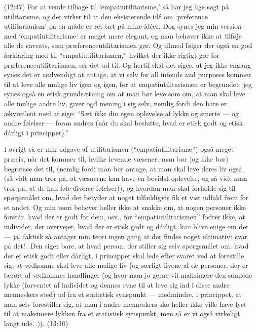 \documentclass{report}
\begin{document}
(12:47) For at vende tilbage til `empatiutilitarisme,' så har jeg lige søgt på utilitarisme, og det virker til at den eksisterende idé om `preference utilitarianism' på en måde er ret tæt på mine idéer. Dog synes jeg min version med `empatiutilitarisme' er meget mere elegant, og man behøver ikke at tilføje alle de caveats, som præferenceutilitarismen gør. Og tilmed følger der også en god forklaring med til ``empatiutilitarismen,'' hvilket der ikke rigtigt gør for præferenceutilitarismen, ser det ud til. Og hertil skal det siges, at jeg ikke engang synes det er nødvendigt at antage, at vi selv for all intends and purposes kommer til at leve alle mulige liv igen og igen, før at empatiutilitarismen er begrundet; jeg synes også en etisk grundsætning om at man bør leve som om, at man skal leve alle mulige andre liv, giver ogd mening i sig selv, nemlig fordi den bare er ækvivalent med at sige: ``Sæt ikke din egen oplevelse af lykke og smerte --- og andre følelser --- foran andres (når du skal beslutte, hvad er etisk godt og etisk dårligt i princippet).'' 

I øvrigt så er min udgave af utilitarismen (``empatiutilitarisme'') også meget præcis, når det kommer til, hvilke levende væsener, man bør (og ikke bør) begrænse det til, (nemlig fordi man bør antage, at man skal leve deres liv også (så vidt man tror på, at væsnerne kan have en bevidst oplevelse, og så vidt man tror på, at de kan føle diverse følelser)), og hvordan man skal forholde sig til spørgsmålet om, hvad det betyder at noget tilfældigvis fik et vist udfald frem for et andet. Og min teori behøver heller ikke at snakke om, at nogen personer ikke forstår, hvad der er godt for dem, osv., for ``empatiutilitarismen'' fodrer ikke, at individer, der overvejer, hvad der er etisk godt og dårligt, kan blive enige om det --- ja, faktisk så antager min teori ingen gang at der findes noget ultimativt svar på det!\,. Den siger bare, at hvad person, der stiller sig selv spørgsmålet om, hvad der er etisk godt eller dårligt, i princippet skal lede efter svaret ved at forestille sig, at vedkomne skal leve alle mulige liv (og særligt livene af de personer, der er berørt af vedkomnes handlinger (og hvor man jo gerne vil maksimere den samlede lykke (forventet af individet og dennes evne til at leve sig ind i disse andre menneskers sted) ud fra et statistisk synspunkt --- medmindre, i princippet, at man selv forestiller sig, at man i andre menneskers sko heller ikke ville have lyst til at maksimere lykken fra et statistisk synspunkt, men så er vi også virkeligt langt ude.\,.)). (13:10)
\end{document}

